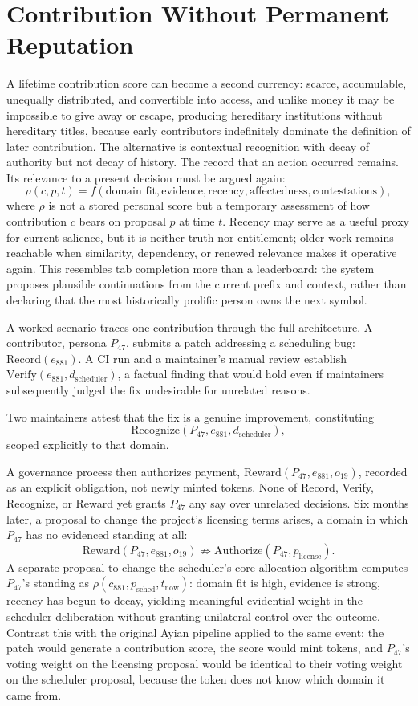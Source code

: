 \section{Contribution Without Permanent Reputation}

A lifetime contribution score can become a second currency: scarce, accumulable, unequally distributed, and convertible into access, and unlike money it may be impossible to give away or escape, producing hereditary institutions without hereditary titles, because early contributors indefinitely dominate the definition of later contribution. The alternative is contextual recognition with decay of authority but not decay of history. The record that an action occurred remains. Its relevance to a present decision must be argued again:
\[
\rho(c,p,t) = f(\text{domain fit}, \text{evidence}, \text{recency}, \text{affectedness}, \text{contestations}),
\]
where $\rho$ is not a stored personal score but a temporary assessment of how contribution $c$ bears on proposal $p$ at time $t$. Recency may serve as a useful proxy for current salience, but it is neither truth nor entitlement; older work remains reachable when similarity, dependency, or renewed relevance makes it operative again. This resembles tab completion more than a leaderboard: the system proposes plausible continuations from the current prefix and context, rather than declaring that the most historically prolific person owns the next symbol.

A worked scenario traces one contribution through the full architecture. A contributor, persona $P_{47}$, submits a patch addressing a scheduling bug: $\mathrm{Record}(e_{881})$. A CI run and a maintainer's manual review establish $\mathrm{Verify}(e_{881}, d_{\mathrm{scheduler}})$, a factual finding that would hold even if maintainers subsequently judged the fix undesirable for unrelated reasons.

Two maintainers attest that the fix is a genuine improvement, constituting
\[
\mathrm{Recognize}(P_{47}, e_{881}, d_{\mathrm{scheduler}}),
\]
scoped explicitly to that domain.

A governance process then authorizes payment, $\mathrm{Reward}(P_{47}, e_{881}, o_{19})$, recorded as an explicit obligation, not newly minted tokens. None of Record, Verify, Recognize, or Reward yet grants $P_{47}$ any say over unrelated decisions. Six months later, a proposal to change the project's licensing terms arises, a domain in which $P_{47}$ has no evidenced standing at all:
\[
\mathrm{Reward}(P_{47}, e_{881}, o_{19}) \not\Rightarrow \mathrm{Authorize}(P_{47}, p_{\mathrm{license}}).
\]
A separate proposal to change the scheduler's core allocation algorithm computes $P_{47}$'s standing as $\rho(c_{881}, p_{\mathrm{sched}}, t_{\mathrm{now}})$: domain fit is high, evidence is strong, recency has begun to decay, yielding meaningful evidential weight in the scheduler deliberation without granting unilateral control over the outcome. Contrast this with the original Ayian pipeline applied to the same event: the patch would generate a contribution score, the score would mint tokens, and $P_{47}$'s voting weight on the licensing proposal would be identical to their voting weight on the scheduler proposal, because the token does not know which domain it came from.

